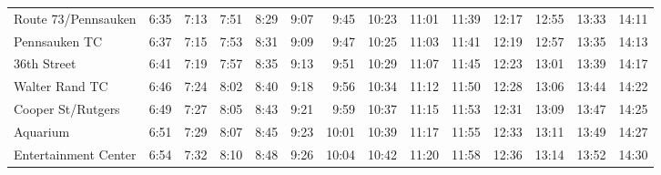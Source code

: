 \begin{center}
\begin{tabular}{@{}lrrrrrrrrrrrrr@{}}
Route 73/Pennsauken & 6:35 & 7:13 & 7:51 & 8:29 & 9:07 & 9:45 & 10:23 & 11:01 & 11:39 & 12:17 & 12:55 & 13:33 & 14:11 \\
Pennsauken TC & 6:37 & 7:15 & 7:53 & 8:31 & 9:09 & 9:47 & 10:25 & 11:03 & 11:41 & 12:19 & 12:57 & 13:35 & 14:13 \\
36th Street & 6:41 & 7:19 & 7:57 & 8:35 & 9:13 & 9:51 & 10:29 & 11:07 & 11:45 & 12:23 & 13:01 & 13:39 & 14:17 \\
Walter Rand TC & 6:46 & 7:24 & 8:02 & 8:40 & 9:18 & 9:56 & 10:34 & 11:12 & 11:50 & 12:28 & 13:06 & 13:44 & 14:22 \\
Cooper St/Rutgers & 6:49 & 7:27 & 8:05 & 8:43 & 9:21 & 9:59 & 10:37 & 11:15 & 11:53 & 12:31 & 13:09 & 13:47 & 14:25 \\
Aquarium & 6:51 & 7:29 & 8:07 & 8:45 & 9:23 & 10:01 & 10:39 & 11:17 & 11:55 & 12:33 & 13:11 & 13:49 & 14:27 \\
Entertainment Center & 6:54 & 7:32 & 8:10 & 8:48 & 9:26 & 10:04 & 10:42 & 11:20 & 11:58 & 12:36 & 13:14 & 13:52 & 14:30 \\
\bottomrule\end{tabular}\end{center}
